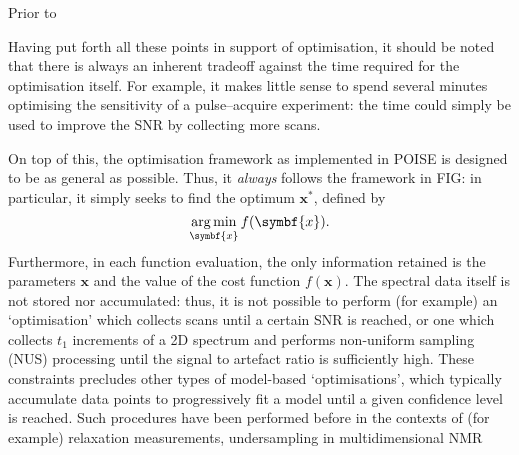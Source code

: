 Prior to 


Having put forth all these points in support of optimisation, it should be noted that there is always an inherent tradeoff against the time required for the optimisation itself.
For example, it makes little sense to spend several minutes optimising the sensitivity of a pulse--acquire experiment: the time could simply be used to improve the SNR by collecting more scans.

On top of this, the optimisation framework as implemented in POISE is designed to be as general as possible.
Thus, it \textit{always} follows the framework in FIG: in particular, it simply seeks to find the optimum $\symbf{x}^*$, defined by
\begin{equation}
    \label{eq:poise_argmin}
    \underset{\symbf{x}}{\argmin}\, f(\symbf{x}).
\end{equation}
Furthermore, in each function evaluation, the only information retained is the parameters $\symbf{x}$ and the value of the cost function $f(\symbf{x})$.
The spectral data itself is not stored nor accumulated: thus, it is not possible to perform (for example) an `optimisation' which collects scans until a certain SNR is reached, or one which collects $t_1$ increments of a 2D spectrum and performs non-uniform sampling (NUS) processing until the signal to artefact ratio is sufficiently high.
These constraints precludes other types of model-based `optimisations', which typically accumulate data points to progressively fit a model until a given confidence level is reached.
Such procedures have been performed before in the contexts of (for example) relaxation measurements\autocite{Song2018JMR,Tang2019SR}, undersampling in multidimensional NMR\autocite{Eghbalnia2005JACS,Hansen2016ACIE,BrukerSmartDriveNMR}

